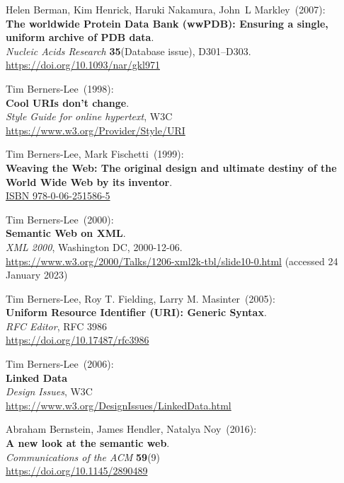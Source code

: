\begin{thebibliography}{9}
Helen Berman, Kim Henrick, Haruki Nakamura, John~L Markley~(2007): \\
\textbf{The worldwide Protein Data Bank (wwPDB): Ensuring a single, uniform archive of PDB data}.\\
\emph{Nucleic Acids Research} \textbf{35}(Database issue),
D301--D303.\\
\url{https://doi.org/10.1093/nar/gkl971}

Tim Berners-Lee~(1998): \\
\textbf{Cool {URIs} don't change}. \\
\emph{Style Guide for online hypertext}, W3C \\
\url{https://www.w3.org/Provider/Style/URI} 

Tim Berners-Lee, Mark Fischetti~(1999): \\
\textbf{Weaving the {Web}: The original design and ultimate destiny of the {World Wide Web} by its
inventor}.\\
\href{https://identifiers.org/isbn/9780062515865}{ISBN 978-0-06-251586-5}

Tim Berners-Lee~(2000): \\
\textbf{Semantic Web on XML}. \\
\emph{XML 2000}, Washington DC, 2000-12-06. \\
\url{https://www.w3.org/2000/Talks/1206-xml2k-tbl/slide10-0.html}
(accessed 24 January 2023)

Tim Berners-Lee, Roy T. Fielding, Larry M. Masinter~(2005): \\
\textbf{Uniform {Resource Identifier} ({URI}): {Generic Syntax}}.\\
\emph{RFC Editor}, RFC 3986 \\
\url{https://doi.org/10.17487/rfc3986}

Tim Berners-Lee~(2006): \\
\textbf{Linked {Data}}\\
\emph{Design Issues}, W3C \\
\url{https://www.w3.org/DesignIssues/LinkedData.html}

Abraham Bernstein, James Hendler, Natalya Noy~(2016): \\
\textbf{A new look at the semantic web}. \\
\emph{Communications of the ACM} \textbf{59}(9) \\
\url{https://doi.org/10.1145/2890489}


\end{thebibliography}
